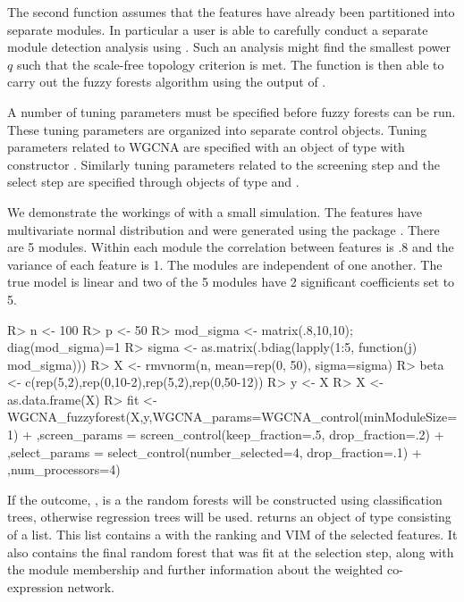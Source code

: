 \documentclass[article,shortnames]{jss}
\begin{document}
The second function  assumes that the features have already been partitioned into separate modules.
In particular a user is able to carefully conduct a separate module detection analysis using .  Such an 
analysis might find the smallest power $q$ such that the scale-free topology criterion is met.  The function 
is then able to carry out the fuzzy forests algorithm using the output of .

A number of tuning parameters must be specified before fuzzy forests can be run.   These tuning parameters are organized
into separate control objects.  Tuning parameters related to WGCNA are specified with an  object of type 
with constructor \newline {}.
Similarly tuning parameters related to the screening step and the select step are specified through objects of type 
 and .  

We demonstrate the workings of  with a small simulation.
The features have multivariate normal distribution and were generated using the package .  
There are 5 modules.  Within each module the correlation between features
is .8 and the variance of each feature is 1.  The modules are independent of one another.
The true model is linear and two of the 5 modules have 2 significant coefficients set to 5.
\begin{CodeChunk}
\begin{CodeInput}
R> n <- 100
R> p <- 50
R> mod_sigma <- matrix(.8,10,10); diag(mod_sigma)=1
R> sigma <- as.matrix(.bdiag(lapply(1:5, function(j) mod_sigma))) 
R> X <- rmvnorm(n, mean=rep(0, 50), sigma=sigma)
R> beta <- c(rep(5,2),rep(0,10-2),rep(5,2),rep(0,50-12))
R> y <- X%
R> X <- as.data.frame(X)
R> fit <- WGCNA_fuzzyforest(X,y,WGCNA_params=WGCNA_control(minModuleSize=1)
+ ,screen_params = screen_control(keep_fraction=.5, drop_fraction=.2)
+ ,select_params = select_control(number_selected=4, drop_fraction=.1) 
+ ,num_processors=4)
\end{CodeInput}
\end{CodeChunk}
If the outcome, , is a  the random forests will be constructed using classification trees,
otherwise regression trees will be used.  returns an  object of type 
 consisting of a list.  This list contains a  with the ranking and VIM 
of the selected features.  It also contains the final random forest that was fit at the selection step, along 
with the module membership and further information about the weighted co-expression network.
\end{document}
